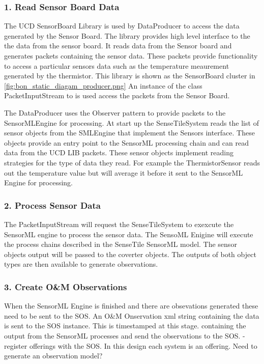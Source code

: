 \documentclass[]{final_report}
\begin{document}
\subsubsection {1. Read Sensor Board Data}

The UCD SensorBoard Library is used by DataProducer to access
the data generated by the Sensor Board.
The library provides high level interface to the
the data from the sensor board. It reads data from the Sensor board and generates packets
containing the sensor data. These packets provide functionality
to access a particular sensors data such as the temperature
meaurement generated by the thermistor. 
This library is shown as the SensorBoard cluster in \ref{fig:bon_static_diagam_producer.png}
An instance of the class PacketInputStream to is used access the packets from the Sensor Board.

The DataProducer uses the Observer pattern to provide
packets to the SensorMLEngine for processing.
At start up the SenseTileSystem reads the list of sensor objects from the SMLEngine that
implement the Sensors interface. These objects provide an entry point
to the SensorML processing chain and can read data from the UCD LIB packets.
These sensor objects implement reading strategies for the type of data they read. 
For example the ThermistorSensor reads out the temperature value
but will average it before it sent to the SensorML Engine for processing.

\subsubsection {2. Process Sensor Data}
The PacketInputStream will request the SenseTileSystem to exexcute
the SensorML engine to process the sensor data. The SensoML Enigine
will execute the process chains described in the SenseTile SensorML model.
The sensor objects output will be passed to the coverter objects. The
outputs of both object types are then available to generate observations.

\subsubsection {3. Create O\&M Observations}

When the SensorML Engine is finished
and there are obsevations generated these
need to be sent to the SOS. An O\&M Onservation
xml string containing the data is sent to
the SOS instance. This is timestamped at
this stage.
 containing the output from
the SensorML processes and send the observations
to the SOS.
-register offerings with the SOS. In this design
each system is an offering.
Need to generate an observation model?
\end{document}
